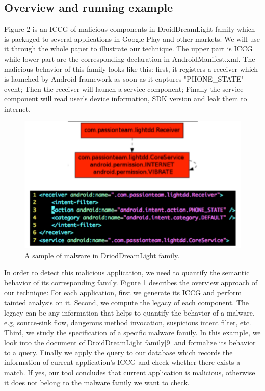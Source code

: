 \documentclass{sig-alternate}
\begin{document}
\subsection{Overview and running example}
Figure 2 is an ICCG of malicious components in DroidDreamLight family which is packaged to several applications in Google Play and other markets. We will use it through the whole paper to illustrate our technique. The upper part is ICCG while lower part are the corresponding declaration in AndroidManifest.xml. The malicious behavior of this family looks like this: first, it registers a receiver which is launched by Android framework as soon as it captures  "PHONE\_STATE" event; Then the receiver will launch a service component;  Finally the service component will read user's device information, SDK version and leak them to internet.
\begin{figure}
\begin{center}
  \includegraphics[scale=0.7]{img/example}
\end{center}
\caption{A sample of malware in DriodDreamLight family.}
\label{fig-ffsm}
\end{figure}

In order to detect this malicious application, we need to quantify the semantic behavior of its corresponding family. Figure 1 describes the overview approach of our technique: For each application, first we generate its 
ICCG and perform tainted analysis on it. Second, we compute the legacy of each component. The legacy can be any information that helps to quantify the behavior of a malware. e.g, source-sink flow, dangerous method invocation, suspicious intent filter, etc. Third, we study the specification of a specific malware family. In this example, we look into the document of DroidDreamLight family[9] and formalize its behavior to a query. Finally we apply the query to our database which records the information of current application's ICCG and check whether there exists a match. If yes, our tool concludes that current application is malicious, otherwise it does not belong to the malware family we want to check.
\end{document}
